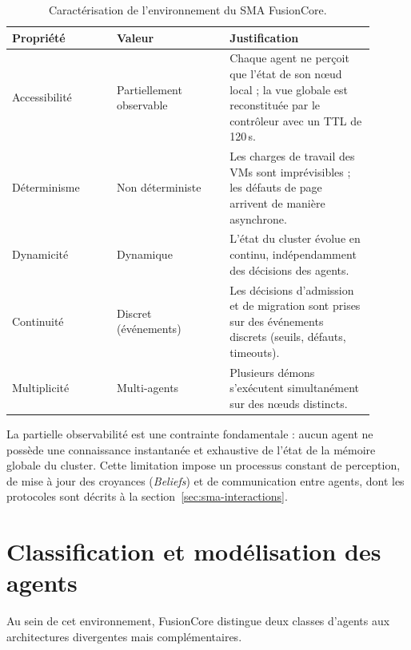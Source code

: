 \begin{table}[htbp]
    \centering
    \caption{Caractérisation de l'environnement du SMA FusionCore.}
    \label{tab:sma-environnement}
    \begin{tabular}{p{0.26\linewidth} p{0.28\linewidth} p{0.36\linewidth}}
        \toprule
        \textbf{Propriété} & \textbf{Valeur} & \textbf{Justification} \\
        \midrule
        Accessibilité & Partiellement observable & Chaque agent ne perçoit que l'état de son nœud local ; la vue globale est reconstituée par le contrôleur avec un TTL de 120\,s. \\
        Déterminisme & Non déterministe & Les charges de travail des VMs sont imprévisibles ; les défauts de page arrivent de manière asynchrone. \\
        Dynamicité & Dynamique & L'état du cluster évolue en continu, indépendamment des décisions des agents. \\
        Continuité & Discret (événements) & Les décisions d'admission et de migration sont prises sur des événements discrets (seuils, défauts, timeouts). \\
        Multiplicité & Multi-agents & Plusieurs démons s'exécutent simultanément sur des nœuds distincts. \\
        \bottomrule
    \end{tabular}
\end{table}

La partielle observabilité est une contrainte fondamentale : aucun agent ne possède une connaissance instantanée et exhaustive de l'état de la mémoire globale du cluster. Cette limitation impose un processus constant de perception, de mise à jour des croyances (\textit{Beliefs}) et de communication entre agents, dont les protocoles sont décrits à la section~\ref{sec:sma-interactions}.

\section{Classification et modélisation des agents}
\label{sec:sma-entites}

Au sein de cet environnement, FusionCore distingue deux classes d'agents aux architectures divergentes mais complémentaires.

